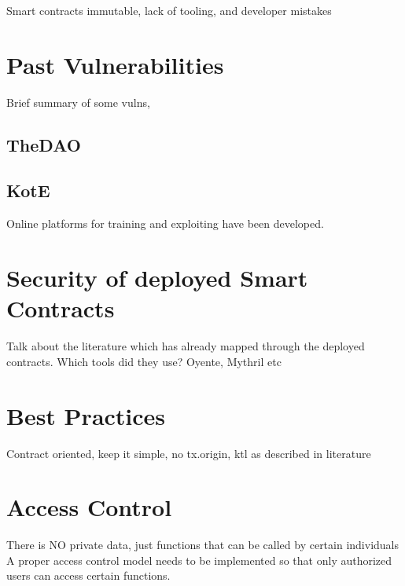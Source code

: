 Smart contracts immutable, lack of tooling, and developer mistakes

\section{Past Vulnerabilities}
Brief summary of some vulns, 
\subsection{TheDAO}
\subsection{KotE}
Online platforms for training and exploiting have been developed.

\section{Security of deployed Smart Contracts}
Talk about the literature which has already mapped through the deployed contracts. 
Which tools did they use? Oyente, Mythril etc

\section{Best Practices}
Contract oriented, keep it simple, no tx.origin, ktl as described in literature

\section{Access Control}
There is NO private data, just functions that can be called by certain individuals
A proper access control model needs to be implemented so that only authorized users can access certain functions. 
